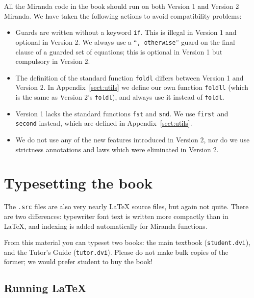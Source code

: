 All the Miranda code in the book should run on both Version 1 and Version 2
Miranda.  We have taken the following actions to avoid compatibility problems:
\begin{itemize}
\item
Guards are written without a keyword \mbox{\tt if}.  This is illegal in Version 1
and optional in Version 2.  We always use a ``\mbox{\tt ,\ otherwise}'' guard on the
final clause of a guarded set of equations; this is optional in Version 1
but compulsory in Version 2.
\item
The definition of the standard function \mbox{\tt foldl} differs between Version 1 and
Version 2.  In Appendix~\ref{sect:utils} we 
define our own function \mbox{\tt foldll} (which is the same
as Version 2's \mbox{\tt foldl}), and always use it instead of \mbox{\tt foldl}.
\item
Version 1 lacks the standard functions \mbox{\tt fst} and \mbox{\tt snd}.  We use 
\mbox{\tt first} and \mbox{\tt second} instead, which are defined in 
Appendix~\ref{sect:utils}.
\item
We do not use any of the new features introduced in Version 2, nor do
we use strictness annotations and laws which were eliminated in Version 2.
\end{itemize}

\section{Typesetting the book}

The \mbox{\tt .src} files are also very nearly \LaTeX{} source files, but again not quite.
There are two differences: typewriter font text is written more compactly than
in \LaTeX{}, and indexing is added automatically for Miranda functions.

From this material you can typeset two books: the main textbook (\mbox{\tt student.dvi}),
and the Tutor's Guide (\mbox{\tt tutor.dvi}).  Please do not make bulk copies of
the former; we would prefer student to buy the book!

\subsection{Running \LaTeX{}}

